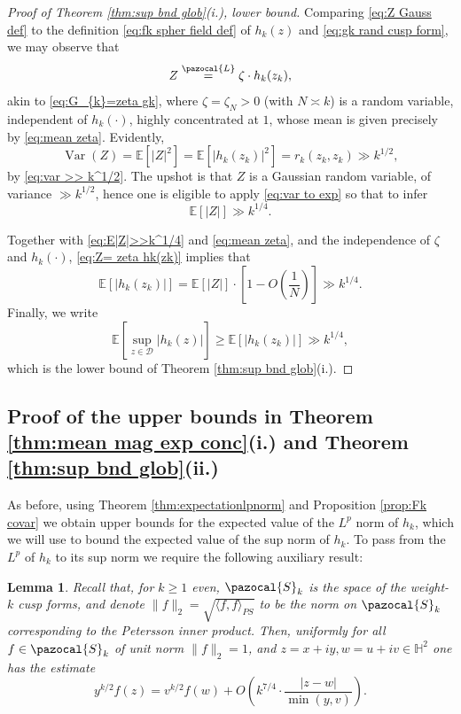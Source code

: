 \documentclass[12pt, a4paper]{amsart}
\newtheorem{lemma}[theorem]{Lemma}
\theoremstyle{definition}
\newcommand {\E} {\mathbb{E}}
\newcommand {\1} {\mathbf{1}}
\newcommand {\Lc} {\pazocal {L}}
\newcommand {\Hb} {\mathbb {H}}
\newcommand {\Dc} {\mathcal{D}}
\newcommand{\var}{\operatorname{Var}}
\newcommand{\Sc}{{\pazocal{S}}}
\numberwithin{equation}{section}
\begin{document}
\begin{proof}[Proof of Theorem \ref{thm:sup bnd glob}(i.), lower bound]
Comparing \eqref{eq:Z Gauss def} to the definition \eqref{eq:fk spher field def} of $h_{k}(z)$ and \eqref{eq:gk rand cusp form}, we may observe that
\begin{equation}
\label{eq:Z= zeta hk(zk)}
Z  \stackrel{\Lc}{=}\zeta \cdot h_{k}(z_{k}),
\end{equation}
akin to \eqref{eq:G_{k}=zeta gk}, where $\zeta=\zeta_{N}>0$ (with $N \asymp k$) is a random variable, independent of $h_{k}(\cdot)$, highly concentrated at $1$, 
whose mean is given precisely by \eqref{eq:mean zeta}. 
Evidently, $$\var(Z) =\E[|Z|^{2}] = \E[|h_{k}(z_{k})|^{2}]=r_{k}(z_{k},z_{k}) \gg k^{1/2},  $$ by \eqref{eq:var >> k^1/2}. The upshot is that $Z$ is a Gaussian random variable, of variance $\gg k^{1/2}$, hence
one is eligible to apply \eqref{eq:var to exp} so that to infer
\begin{equation}
\label{eq:E|Z|>>k^1/4}
\E[|Z|] \gg k^{1/4}.
\end{equation}


Together with \eqref{eq:E|Z|>>k^1/4} and \eqref{eq:mean zeta}, 
and the independence of $\zeta$ and $h_{k}(\cdot)$, \eqref{eq:Z= zeta hk(zk)} implies that
\begin{equation*}
\E[|h_{k}(z_{k})|] = \E[|Z|] \cdot \left[ 1- O\left( \frac{1}{N}  \right)  \right]\gg k^{1/4}.
\end{equation*}
Finally, we write
\begin{equation*}
\E\left[\sup\limits_{z\in\Dc}\left| h_{k}(z)\right|\right] \ge \E\left[\left| h_{k}\left(z_{k}\right)\right|\right]\gg k^{1/4},
\end{equation*}
which is the lower bound of Theorem \ref{thm:sup bnd glob}(i.). \end{proof}



\subsection{Proof of the upper bounds in Theorem \ref{thm:mean mag exp conc}\texorpdfstring{(i.)}{(i.)} and Theorem \ref{thm:sup bnd glob}\texorpdfstring{(ii.)}{(ii.)}} As before, using Theorem \ref{thm:expectationlpnorm} and Proposition \ref{prop:Fk covar} we obtain upper bounds for the expected value of the $L^p$ norm of $h_k$, which we  will use to bound the expected value of the sup norm of $h_k$. To pass from the $L^p$ of $h_k$ to its sup norm we require the following auxiliary result:

\begin{lemma}
\label{prop:cusp form perturbation bound}
Recall that, for $k\ge 1$ even, $\Sc_{k}$ is the space of the weight-$k$ cusp forms, and denote $\|f \|_{2}=\sqrt{\langle f,f\rangle_{PS}}$ to be the norm on $\Sc_{k}$ corresponding to the Petersson inner product.
Then, uniformly for all $f\in \Sc_{k}$ of unit norm $\|f\|_{2}=1$, and $z=x+iy,w=u+iv\in \Hb^{2}$ one has the estimate
\begin{equation*}
y^{k/2}f(z) = v^{k/2}f(w) + O\left(k^{7/4}\cdot \frac{|z-w|}{\min(y,v)}\right).
\end{equation*}

\end{lemma}
\end{document}
